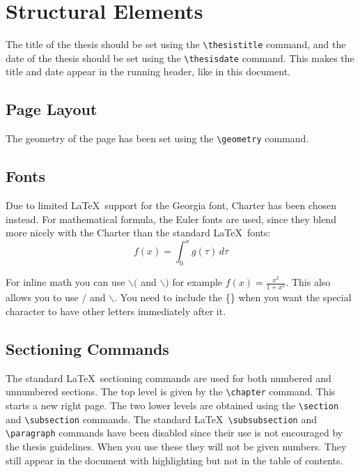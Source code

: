\chapter{Structural Elements}
\label{chap:structural}

The title of the thesis should be set using the \verb+\thesistitle+
command, and the date of the thesis should be set using the
\verb+\thesisdate+ command. This makes the title and date appear in
the running header, like in this document.

\section{Page Layout}

The geometry of the page has been set using the \verb+\geometry+
command.

\section{Fonts}

Due to limited \LaTeX\ support for the Georgia font, Charter has been
chosen instead. For mathematical formula, the Euler fonts are used,
since they blend more nicely with the Charter than the standard
\LaTeX\ fonts: 
$$
 f(x) = \int_0^x g(\tau)\,d\tau
$$

For inline math you can use $\backslash{}($ and $\backslash{})$ for example \( f(x)= \frac{x^2}{1+x^2} \).  
This also allows you to use $\slash$ and $\backslash$. You need to include the \{\} when you want the special
character to have other letters immediately after it.

\section{Sectioning Commands}

The standard \LaTeX\ sectioning commands are used for both numbered
and unnumbered sections. The top level is given by the \verb+\chapter+
command. This starts a new right page. The two lower levels are
obtained using the \verb+\section+ and \verb+\subsection+ commands.
The standard \LaTeX\ \verb+\subsubsection+ and \verb+\paragraph+
commands have been disabled since their use is not encouraged by the
thesis guidelines. When you use these they will not be given numbers.  
They still appear in the document with highlighting but not in the 
table of contents.

